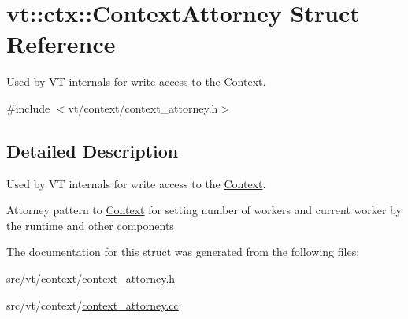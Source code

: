 \hypertarget{structvt_1_1ctx_1_1_context_attorney}{}\section{vt\+:\+:ctx\+:\+:Context\+Attorney Struct Reference}
\label{structvt_1_1ctx_1_1_context_attorney}


Used by VT internals for write access to the \hyperlink{structvt_1_1ctx_1_1_context}{Context}.  




{\ttfamily \#include $<$vt/context/context\+\_\+attorney.\+h$>$}



\subsection{Detailed Description}
Used by VT internals for write access to the \hyperlink{structvt_1_1ctx_1_1_context}{Context}. 

Attorney pattern to \hyperlink{structvt_1_1ctx_1_1_context}{Context} for setting number of workers and current worker by the runtime and other components 

The documentation for this struct was generated from the following files\+:\begin{DoxyCompactItemize}
\item 
src/vt/context/\hyperlink{context__attorney_8h}{context\+\_\+attorney.\+h}\item 
src/vt/context/\hyperlink{context__attorney_8cc}{context\+\_\+attorney.\+cc}\end{DoxyCompactItemize}
